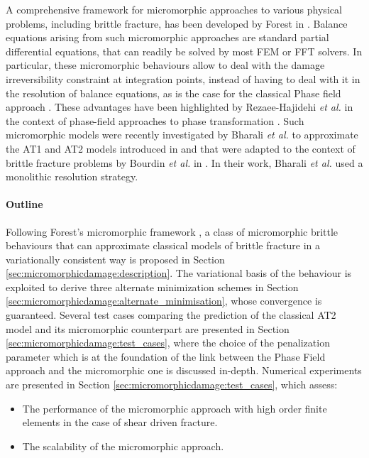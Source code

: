 A comprehensive framework for 
micromorphic approaches to various physical problems,
including brittle fracture, has been developed by Forest in
\cite{forest_micromorphic_2009, forest_nonlinear_2016}.
Balance equations arising from
such micromorphic approaches are
standard partial differential equations, that can readily be solved by
most FEM or FFT solvers.
In particular, these micromorphic behaviours allow to
deal with the damage irreversibility constraint at integration points,
instead of having to deal with it in the resolution of balance equations,
as is the case for the classical Phase field approach \cite{gerasimov_numerical_2020}. These
advantages have been highlighted by Rezaee-Hajidehi \textit{et al.} in the
context of phase-field approaches to phase transformation
\cite{rezaee-hajidehi_micromorphic_2021}.
%
%
%
Such micromorphic models were recently investigated by Bharali \textit{et al.}
\cite{bharali_computational_2021} to approximate the AT1 and AT2 models
introduced in 
\cite{ambrosio_approximation_1990}
and that were adapted to the context of brittle fracture problems by Bourdin \textit{et al.} in
\cite{bourdin_implementation_2000}.
In their work, Bharali \textit{et al.} used a monolithic resolution strategy.

\paragraph{Outline}

Following Forest's micromorphic framework
\cite{forest_micromorphic_2009, forest_nonlinear_2016}, a class of micromorphic
brittle behaviours that can approximate classical models of brittle
fracture in a variationally consistent way is proposed in
Section \ref{sec:micromorphicdamage:description}.
The variational basis of the behaviour is exploited to derive three alternate
minimization schemes in Section
\ref{sec:micromorphicdamage:alternate_minimisation}, whose convergence is guaranteed.
%
%
%
Several test cases comparing the prediction of the classical AT2 model
and its micromorphic counterpart are presented in Section
\ref{sec:micromorphicdamage:test_cases}, where
the choice of the penalization
parameter which is at the foundation of the link between the Phase Field approach and the 
micromorphic one is discussed in-depth.
%
%
%
Numerical experiments are presented in Section
\ref{sec:micromorphicdamage:test_cases}, which assess:
%
%
%
\begin{itemize}
    \item The performance of the micromorphic approach with high order finite
    elements in the case of shear driven fracture.
    \item The scalability of the micromorphic approach.
\end{itemize}